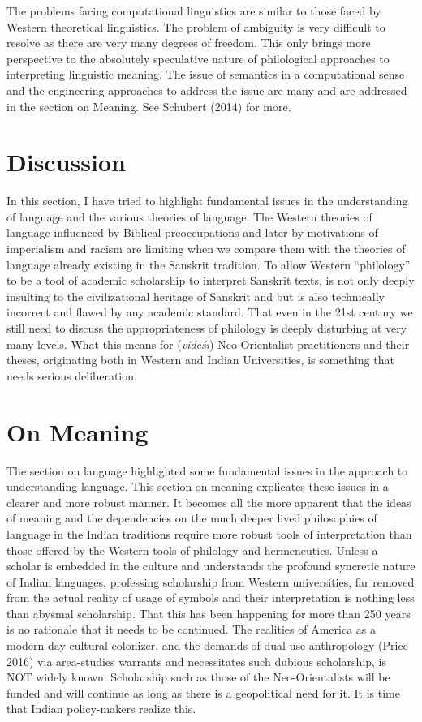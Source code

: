 The problems facing computational linguistics are similar to those faced by Western theoretical linguistics. The problem of ambiguity is very difficult to resolve as there are very many degrees of freedom. This only brings more perspective to the absolutely speculative nature of philological approaches to interpreting linguistic meaning. The issue of semantics in a computational sense and the engineering approaches to address the issue are many and are addressed in the section on Meaning. See Schubert (2014) for more.


\section*{Discussion}

In this section, I have tried to highlight fundamental issues in the understanding of language and the various theories of language. The Western theories of language influenced by Biblical preoccupations and later by motivations of imperialism and racism are limiting when we compare them with the theories of language already existing in the Sanskrit tradition. To allow Western “philology” to be a tool of academic scholarship to interpret Sanskrit texts, is not only deeply insulting to the civilizational heritage of Sanskrit and but is also technically incorrect and flawed by any academic standard. That even in the 21st century we still need to discuss the appropriateness of philology is deeply disturbing at very many levels. What this means for (\textit{videśī}) Neo-Orientalist practitioners and their theses, originating both in Western and Indian Universities, is something that needs serious deliberation.

\newpage


\section*{On Meaning}

The section on language highlighted some fundamental issues in the approach to understanding language. This section on meaning explicates these issues in a clearer and more robust manner. It becomes all the more apparent that the ideas of meaning and the dependencies on the much deeper lived philosophies of language in the Indian traditions require more robust tools of interpretation than those offered by the Western tools of philology and hermeneutics. Unless a scholar is embedded in the culture and understands the profound syncretic nature of Indian languages, professing scholarship from Western universities, far removed from the actual reality of usage of symbols and their interpretation is nothing less than abysmal scholarship. That this has been happening for more than 250 years is no rationale that it needs to be continued. The realities of America as a modern-day cultural colonizer, and the demands of dual-use anthropology (Price 2016) via area-studies warrants and necessitates such dubious scholarship, is NOT widely known. Scholarship such as those of the Neo-Orientalists will be funded and will continue as long as there is a geopolitical need for it. It is time that Indian policy-makers realize this.


